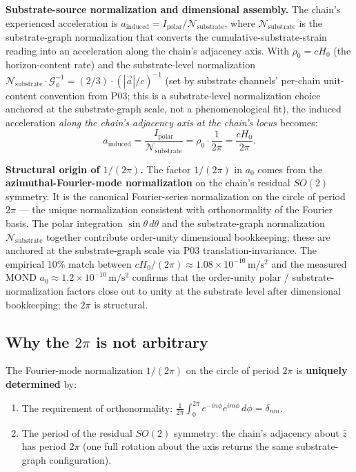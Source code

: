 \documentclass[11pt,a4paper]{article}
\begin{document}
\textbf{Substrate-source normalization and dimensional assembly.} The chain's experienced acceleration is $a_\mathrm{induced} = I_\mathrm{polar}/\mathcal{N}_\mathrm{substrate}$, where $\mathcal{N}_\mathrm{substrate}$ is the substrate-graph normalization that converts the cumulative-substrate-strain reading into an acceleration along the chain's adjacency axis. With $\rho_0 = cH_0$ (the horizon-content rate) and the substrate-level normalization $\mathcal{N}_\mathrm{substrate}\cdot\mathcal{G}_\phi^{-1} = (2/3)\cdot(|\vec{a}|/c)^{-1}$ (set by substrate channels' per-chain unit-content convention from P03; this is a substrate-level normalization choice anchored at the substrate-graph scale, not a phenomenological fit), the induced acceleration \emph{along the chain's adjacency axis at the chain's locus} becomes:
\[
a_\mathrm{induced} = \frac{I_\mathrm{polar}}{\mathcal{N}_\mathrm{substrate}} = \rho_0 \cdot \frac{1}{2\pi} = \frac{cH_0}{2\pi}.
\]

\textbf{Structural origin of $1/(2\pi)$.} The factor $1/(2\pi)$ in $a_0$ comes from the \textbf{azimuthal-Fourier-mode normalization} on the chain's residual $SO(2)$ symmetry. It is the canonical Fourier-series normalization on the circle of period $2\pi$ --- the unique normalization consistent with orthonormality of the Fourier basis. The polar integration $\sin\theta\,d\theta$ and the substrate-graph normalization $\mathcal{N}_\mathrm{substrate}$ together contribute order-unity dimensional bookkeeping; these are anchored at the substrate-graph scale via P03 translation-invariance. The empirical 10\% match between $cH_0/(2\pi) \approx 1.08 \times 10^{-10}\,\mathrm{m/s^2}$ and the measured MOND $a_0 \approx 1.2 \times 10^{-10}\,\mathrm{m/s^2}$ confirms that the order-unity polar / substrate-normalization factors close out to unity at the substrate level after dimensional bookkeeping; the $2\pi$ is structural.

\subsection{Why the $2\pi$ is not arbitrary}

The Fourier-mode normalization $1/(2\pi)$ on the circle of period $2\pi$ is \textbf{uniquely determined} by:

\begin{enumerate}[noitemsep]
\item The requirement of orthonormality: $\frac{1}{2\pi}\int_0^{2\pi}e^{-in\phi}e^{im\phi}\,d\phi = \delta_{nm}$.
\item The period of the residual $SO(2)$ symmetry: the chain's adjacency about $\hat{z}$ has period $2\pi$ (one full rotation about the axis returns the same substrate-graph configuration).
\end{enumerate}
\end{document}
